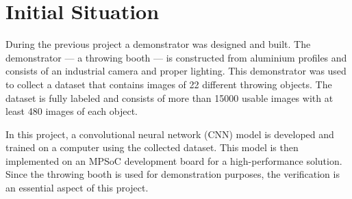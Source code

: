 \chapter{Initial Situation}
\label{ch:initial_situation}

During the previous project a demonstrator was designed and built.
The demonstrator --- a throwing booth --- is constructed from aluminium profiles and consists of an industrial camera and proper lighting.
This demonstrator was used to collect a dataset that contains images of 22 different throwing objects.
The dataset is fully labeled and consists of more than \num{15000} usable images with at least 480 images of each object.

In this project, a convolutional neural network (CNN) model is developed and trained on a computer using the collected dataset.
This model is then implemented on an MPSoC development board for a high-performance solution.
Since the throwing booth is used for demonstration purposes, the verification is an essential aspect of this project.
